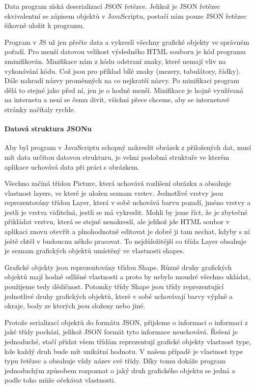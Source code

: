 \documentclass[
  field=inf,
  biblatex,
  glossaries,
  index
]{kidiplom}
\begin{document}
Data program získá deserializací JSON řetězce. Jelikož je JSON řetězec ekvivalentní se zápisem objektů v JavaScriptu, postačí nám pouze JSON řetězec šikovně uložit k programu.

Program v JS už jen přečte data a vykreslí všechny grafické objekty ve správném pořadí. Pro menší datovou velikost výsledného HTML souboru je kód programu zminifikován. Minifikace nám z kódu odstraní znaky, které nemají vliv na vykonávání kódu. Což jsou pro příklad bílé znaky (mezery, tabulátory, řádky). Dále nahradí názvy proměnných na co nejkratší názvy. Po minifikaci program dělá to stejné jako před ní, jen je o hodně menší. Minifikace je hojně využívaná na internetu a není se čemu divit, všichni přece chceme, aby se internetové stránky načítaly rychle.

\paragraph{Datová struktura JSONu}
Aby byl program v JavaScriptu schopný nakreslit obrázek z přiložených dat, musí mít data určitou datovou strukturu, je velmi podobná struktuře ve kterém aplikace uchovává data při práci s obrázkem.

Všechno začíná třídou Picture, která uchovává rozlišení obrázku a obsahuje vlastnost layers, ve které je uložen seznam vrstev. Jednotlivé vrstvy jsou reprezentovány třídou Layer, která v sobě uchovává barvu pozadí, jméno vrstvy a jestli je vrstva viditelná, jestli se má vykreslit. Mohli by jsme říct, že je zbytečné přikládat vrstvu, která se stejně nenakreslí, ale jelikož jde HTML soubor v aplikaci znovu otevřít a plnohodnotně editovat je dobré ji tam nechat, kdyby s ní ještě chtěl v budoucnu někdo pracovat. To nejdůležitější co třída Layer obsahuje je seznam grafických objektů  umístěný ve vlastnosti shapes.

Grafické objekty jsou reprezentovány třídou Shape. Různé druhy grafických objektů mají hodně odlišné vlastnosti a proto by nebylo moudré všechno ukládat, použijeme tedy dědičnost. Potomky třídy Shape jsou třídy reprezentující jednotlivé druhy grafických objektů, které v sobě uchovávají barvy výplně a okraje, body ze kterých jsou složeny nebo jiné.

Protože serializací objektů do formátu JSON, přijdeme o informaci o informaci z jaké třídy pochází, jelikož JSON formát tyto informace neuchovává. Řešení je jednoduché, stačí přidat všem třídám reprezentují grafické objekty vlastnost type, kde každý druh bude mít unikátní hodnotu. V našem případě je vlastnost type typu řetězec a obsahuje vždy název své třídy. Díky tomu dokáže program jednoduchým způsobem rozpoznat o jaký druh grafického objektu se jedná a podle toho může očekávat vlastnosti.
\end{document}

